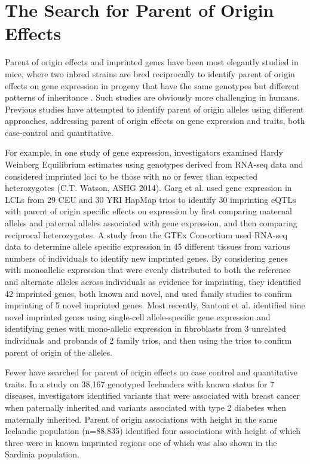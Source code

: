 \section{The Search for Parent of Origin Effects}


Parent of origin effects and imprinted genes have been most elegantly studied in mice, where two inbred strains are bred reciprocally to identify parent of origin effects on gene expression in progeny that have the same genotypes but different patterns of inheritance\cite{Babak2012} . Such studies are obviously more challenging in humans. Previous studies have attempted to identify parent of origin alleles using different approaches, addressing parent of origin effects on gene expression and traits, both case-control and quantitative.

For example, in one study of gene expression, investigators examined Hardy Weinberg Equilibrium estimates using genotypes derived from RNA-seq data and considered imprinted loci to be those with no or fewer than expected heterozygotes (C.T. Watson, ASHG 2014). Garg et al. used gene expression in LCLs from 29 CEU and 30 YRI HapMap trios to identify 30 imprinting eQTLs with parent of origin specific effects on expression by first comparing maternal alleles and paternal alleles associated with gene expression, and then comparing reciprocal heterozygotes\cite{Garg2012a}. A study from the GTEx Consortium used RNA-seq data to determine allele specific expression in 45 different tissues from various numbers of individuals to identify new imprinted genes\cite{Baran:2015cx}. By considering genes with monoallelic expression that were evenly distributed to both the reference and alternate alleles across individuals as evidence for imprinting, they identified 42 imprinted genes, both known and novel, and used family studies to confirm imprinting of 5 novel imprinted genes. Most recently, Santoni et al. identified nine novel imprinted genes using single-cell allele-specific gene expression and identifying genes with mono-allelic expression in fibroblasts from 3 unrelated individuals and probands of 2 family trios, and then using the trios to confirm parent of origin of the alleles\cite{Santoni:2017hu}.

Fewer have searched for parent of origin effects on case control and quantitative traits. In a study on 38,167 genotyped Icelanders with known status for 7 diseases, investigators identified variants that were associated with breast cancer when paternally inherited and variants associated with type 2 diabetes when maternally inherited\cite{Kong:2009kk}. Parent of origin associations with height in the same Icelandic population (n=88,835) identified four associations with height of which three were in known imprinted regions one of which was also shown in the Sardinia population\cite{Zoledziewska:2015do}.

